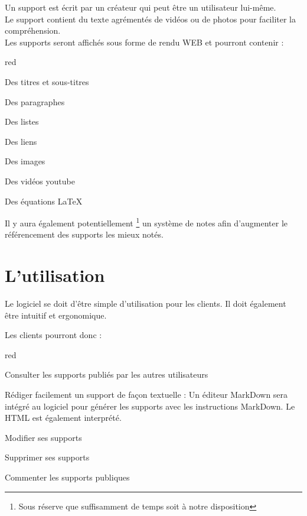 Un support est écrit par un créateur qui peut être un utilisateur lui-même.\\ Le support contient du texte agrémentés de vidéos ou de photos pour faciliter la compréhension. \\
Les supports seront affichés sous forme de rendu WEB et pourront contenir :

  \begin{items}{red}{\Circle}
    \item Des titres et sous-titres
    \item Des paragraphes
    \item Des listes
    \item Des liens
    \item Des images
    \item Des vidéos youtube
    \item Des équations \LaTeX
 \end{items}
 
 
 Il y aura également potentiellement \footnote{Sous réserve que suffisamment de temps soit à notre disposition} un système de notes afin d’augmenter le référencement des supports les mieux notés. 

\section{L'utilisation}

Le logiciel se doit d'être simple d'utilisation pour les clients. Il doit également être intuitif et ergonomique.

Les clients pourront donc : 

  \begin{items}{red}{\Circle}
    \item Consulter les supports publiés par les autres utilisateurs
    \item Rédiger facilement un support de façon textuelle : Un éditeur MarkDown sera intégré au logiciel pour générer les supports avec les instructions MarkDown. Le HTML est également interprété.
    \item Modifier ses supports
    \item Supprimer ses supports
    \item Commenter les supports publiques
 \end{items}


